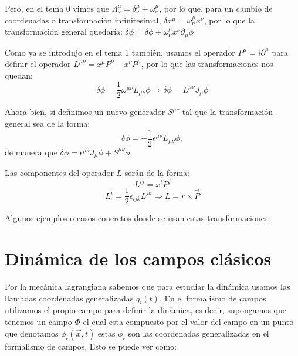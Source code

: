 Pero, en el tema 0 vimos que $\Lambda^\mu_\nu = \delta^\mu_\nu + \omega^\mu_\nu$, por lo que, para un cambio de coordenadas o transformación infinitesimal, $\delta x^\mu = \omega^\mu_\nu x^\nu$, por lo que la transformación general quedaría:
$
\delta \phi = \delta \phi + \omega^\mu_\nu x^\nu \partial_\mu \phi
$

Como ya se introdujo en el tema 1 también, usamos el operador $P^\mu = i \partial^\mu$ para definir el operador $L^{\mu\nu} = x^\mu P^\nu - x^\nu P^\mu$, por lo que las transformaciones nos quedan:
$$
\delta \phi = \frac{1}{2} \omega^{\mu\nu} L_{\mu\nu} \phi \Rightarrow \delta \phi = L^{\mu\nu} J_\mu \phi
$$

Ahora bien, si definimos un nuevo generador $S^{\mu\nu}$ tal que la transformación general sea de la forma:
$$
\delta \phi = -\frac{1}{2} \epsilon^{\mu\nu} L_{\mu\nu} \phi,
$$
de manera que $\delta \phi = \epsilon^{\mu\nu} J_\mu \phi + S^{\mu\nu} \phi$.

Las componentes del operador $L$ serán de la forma:
$$
L^{ij} = x^i P^j
$$
$$
L^i = \frac{1}{2} \epsilon_{ijk} L^{jk} \Rightarrow \tilde{L} = r \times \vec{P}
$$

Algunos ejemplos o casos concretos donde se usan estas transformaciones:
\begin{example}
  
\end{example}
\begin{example}
  
\end{example}
\begin{example}
  
\end{example}
\begin{example}
  
\end{example}
\section{Dinámica de los campos clásicos}

Por la mecánica lagrangiana sabemos que para estudiar la dinámica usamos las llamadas coordenadas generalizadas $q_{i}(t)$. En el formalismo de campos utilizamos el propio campo para definir la dinámica, es decir, supongamos que tenemos un campo $\Phi$ el cual esta compuesto por el valor del campo en un punto que denotamos $\phi_{i}(\vec{x},t)$ estas $\phi_{i}$ son las coordenadas generalizadas en el formalismo de campos. Esto se puede ver como:

